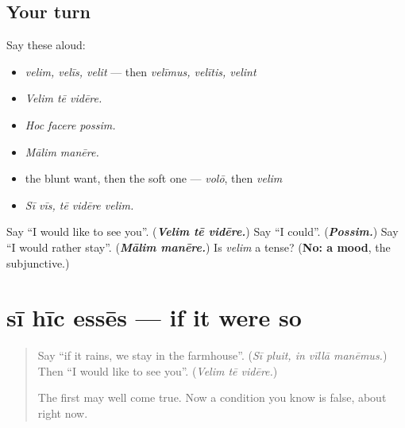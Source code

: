 \subsection*{Your turn}
Say these aloud:

\begin{itemize}
\raggedright
  \item \emph{velim, velīs, velit} — then \emph{velīmus, velītis, velint}
  \item \emph{Velim tē vidēre.}
  \item \emph{Hoc facere possim.}
  \item \emph{Mālim manēre.}
  \item the blunt want, then the soft one — \emph{volō}, then \emph{velim}
  \item \emph{Sī vīs, tē vidēre velim.}
\end{itemize}

\begin{tcolorbox}[breakable,colback=teal!4,colframe=teal!35!black,title={Before you move on}]
Say \textquotedblleft{}I would like to see you\textquotedblright{}. (\emph{\textbf{Velim tē vidēre.}}) Say \textquotedblleft{}I could\textquotedblright{}. (\emph{\textbf{Possim.}}) Say \textquotedblleft{}I would rather stay\textquotedblright{}. (\emph{\textbf{Mālim manēre.}}) Is \emph{velim} a tense? (\textbf{No: a mood}, the subjunctive.)
\end{tcolorbox}
\section[sī hīc essēs, laetus essem]{sī hīc essēs — if it were so}

\label{lesson:LA-C290-si-esset}



\begin{quote}
Say \textquotedblleft{}if it rains, we stay in the farmhouse\textquotedblright{}. (\emph{Sī pluit, in vīllā manēmus.}) Then \textquotedblleft{}I would like to see you\textquotedblright{}. (\emph{Velim tē vidēre.})

The first may well come true. Now a condition you know is false, about right now.
\end{quote}

